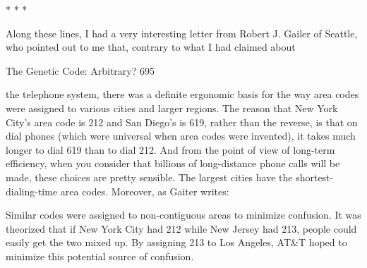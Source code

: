                                         *       *      *

        Along these lines, I had a very interesting letter from Robert J. Gailer of
Seattle, who pointed out to me that, contrary to what I had claimed about




The Genetic Code: Arbitrary?                                                          695

the telephone system, there was a definite ergonomic basis for the way area codes
were assigned to various cities and larger regions. The reason that New York City's
area code is 212 and San Diego's is 619, rather than the reverse, is that on dial phones
(which were universal when area codes were invented), it takes much longer to dial
619 than to dial 212. And from the point of view of long-term efficiency, when you
consider that billions of long-distance phone calls will be made, these choices are
pretty sensible. The largest cities have the shortest-dialing-time area codes. Moreover,
as Gaiter writes:

   Similar codes were assigned to non-contiguous areas to minimize confusion. It
   was theorized that if New York City had 212 while New Jersey had 213, people
   could easily get the two mixed up. By assigning 213 to Los Angeles, AT\&T
   hoped to minimize this potential source of confusion.

